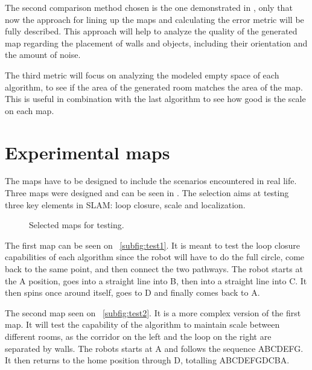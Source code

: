 The second comparison method chosen is the one demonstrated in \cite{santos2013evaluation}, only that now the approach for lining up the maps and calculating the error metric will be fully described. This approach will help to analyze the quality of the generated map regarding the placement of walls and objects, including their orientation and the amount of noise.

The third metric will focus on analyzing the modeled empty space of each algorithm, to see if the area of the generated room matches the area of the map. This is useful in combination with the last algorithm to see how good is the scale on each map.

\section{Experimental maps}\label{sec:selecting_maps}

The maps have to be designed to include the scenarios encountered in real life. Three maps were designed and can be seen in . The selection aims at testing three key elements in SLAM: loop closure, scale and localization.

\begin{figure}[!ht]
     \centering
     \caption{Selected maps for testing.}
     \label{fig:generated_maps}
\end{figure}

The first map can be seen on \figurename~\ref{subfig:test1}. It is meant to test the loop closure capabilities of each algorithm since the robot will have to do the full circle, come back to the same point, and then connect the two pathways. The robot starts at the A position, goes into a straight line into B, then into a straight line into C. It then spins once around itself, goes to D and finally comes back to A.

The second map seen on \figurename~\ref{subfig:test2}. It is a more complex version of the first map. It will test the capability of the algorithm to maintain scale between different rooms, as the corridor on the left and the loop on the right are separated by walls. The robots starts at A and follows the sequence ABCDEFG. It then returns to the home position through D, totalling ABCDEFGDCBA.

